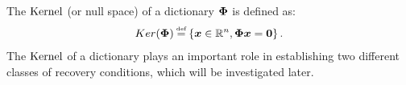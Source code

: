 The $\mathrm{Kernel}$ (or null space) of a dictionary $\boldsymbol{\Phi}$ is defined as:
\begin{gather*}
\label{eq:Kernel}
\myKerMath \myeq 
\mybrace{\boldsymbol{x} \in \mathbb{R}^n, \myPhi \boldsymbol{x} = \boldsymbol{0}}.
\end{gather*}
The $\mathrm{Kernel}$ of a dictionary plays an important role in establishing two different classes of recovery conditions, which will be investigated later.